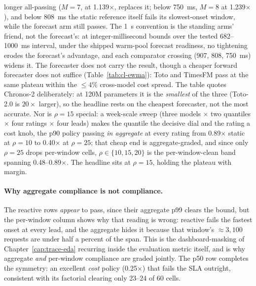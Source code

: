 longer all-passing ($M{=}7$, at 1.139$\times$, replaces it; below
\SI{750}{\milli\second}, $M{=}8$ at 1.239$\times$), and below
\SI{808}{\milli\second} the static reference itself fails its slowest-onset
window, while the forecast arm still passes. The \SI{1}{\second} convention is
the standing arms' friend, not the forecast's: at integer-millisecond
bounds over the tested 682--\SI{1000}{\milli\second} interval, under the
shipped warm-pool forecast readiness, no tightening erodes the forecast's
advantage, and each comparator
crossing (\num{907}, \num{808}, \SI{750}{\milli\second}) widens it. The
forecaster does not carry the result, though a cheaper forward
forecaster does not suffice (Table~\ref{tab:cl-ewma}): Toto and TimesFM pass at
the same plateau within the ${\leq}4\%$ cross-model cost spread. The table
quotes Chronos-2 deliberately: at 120M parameters it is the \emph{smallest} of
the three (Toto-2.0 is $20\times$ larger), so the headline rests on the
cheapest forecaster, not the most accurate. Nor is $\rho{=}15$ special: a
week-scale sweep (three models $\times$ two quantiles $\times$ four ratings
$\times$ four leads) makes the quantile the decisive dial and the rating a cost
knob, the p90 policy passing \emph{in aggregate} at every rating from
0.89$\times$ static at $\rho{=}10$ to 0.40$\times$ at $\rho{=}25$; that cheap
end is aggregate-graded, and since only $\rho{=}25$ drops per-window cells,
$\rho\in\{10,15,20\}$ is the per-window-clean band spanning
0.48--0.89$\times$. The headline sits at $\rho{=}15$, holding the plateau with
margin.

\paragraph{Why aggregate compliance is not compliance.} The reactive rows
\emph{appear} to pass, since their aggregate p99 clears the bound, but the
per-window column shows why that reading is wrong: reactive fails the fastest
onset at every lead, and the aggregate hides it because that window's
${\approx}3{,}100$
requests are under half a percent of the span. This is the dashboard-masking of
Chapter~\ref{cap:trace-eda} recurring inside the evaluation metric itself, and
is why aggregate \emph{and} per-window compliance are graded jointly. The p50
row completes the symmetry: an excellent \emph{cost} policy (0.25$\times$) that
fails the SLA outright, consistent with its factorial clearing only 23--24 of
60 cells.

